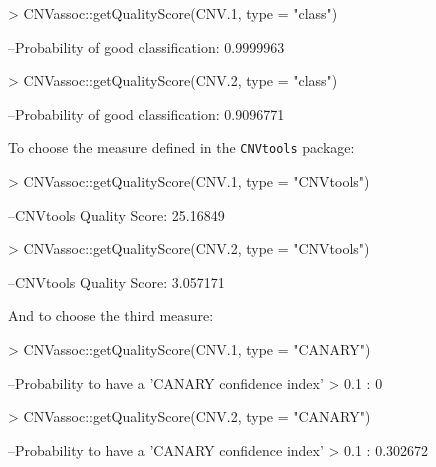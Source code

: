 \documentclass[11pt]{article}
\begin{document}
\begin{Schunk}
\begin{Sinput}
> CNVassoc::getQualityScore(CNV.1, type = "class")
\end{Sinput}
\begin{Soutput}
--Probability of good classification: 0.9999963 
\end{Soutput}
\begin{Sinput}
> CNVassoc::getQualityScore(CNV.2, type = "class")
\end{Sinput}
\begin{Soutput}
--Probability of good classification: 0.9096771 
\end{Soutput}
\end{Schunk}

%
To choose the measure defined in the \texttt{CNVtools} package:
%

\begin{Schunk}
\begin{Sinput}
> CNVassoc::getQualityScore(CNV.1, type = "CNVtools")
\end{Sinput}
\begin{Soutput}
--CNVtools Quality Score: 25.16849 
\end{Soutput}
\begin{Sinput}
> CNVassoc::getQualityScore(CNV.2, type = "CNVtools")
\end{Sinput}
\begin{Soutput}
--CNVtools Quality Score: 3.057171 
\end{Soutput}
\end{Schunk}

%
And to choose the third measure:
%

\begin{Schunk}
\begin{Sinput}
> CNVassoc::getQualityScore(CNV.1, type = "CANARY")
\end{Sinput}
\begin{Soutput}
--Probability to have a 'CANARY confidence index' > 0.1 : 0 
\end{Soutput}
\begin{Sinput}
> CNVassoc::getQualityScore(CNV.2, type = "CANARY")
\end{Sinput}
\begin{Soutput}
--Probability to have a 'CANARY confidence index' > 0.1 : 0.302672 
\end{Soutput}
\end{Schunk}
\end{document}
